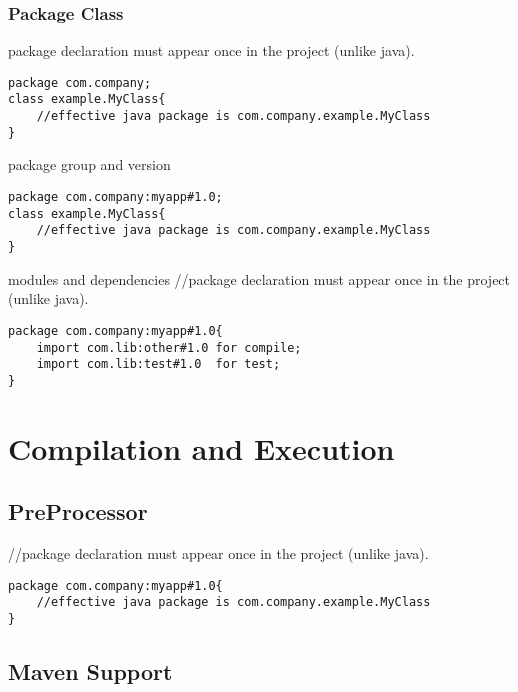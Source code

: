 \documentclass{tufte-book}
\begin{document}
            \subsection{Package Class}
            package declaration must appear once in the project (unlike java).
            \begin{lstlisting}
package com.company;
class example.MyClass{
    //effective java package is com.company.example.MyClass
}
            \end{lstlisting}


            package group and version
            \begin{lstlisting}
package com.company:myapp#1.0;
class example.MyClass{
    //effective java package is com.company.example.MyClass
}
            \end{lstlisting}

            modules and dependencies
//package declaration must appear once in the project (unlike java).

            \begin{lstlisting}
package com.company:myapp#1.0{
    import com.lib:other#1.0 for compile;
    import com.lib:test#1.0  for test;
}
            \end{lstlisting}


        \chapter{Compilation and Execution}

            \section{PreProcessor}

            //package declaration must appear once in the project (unlike java).
            \begin{lstlisting}
package com.company:myapp#1.0{
    //effective java package is com.company.example.MyClass
}
            \end{lstlisting}

            \section{Maven Support}
\end{document}
